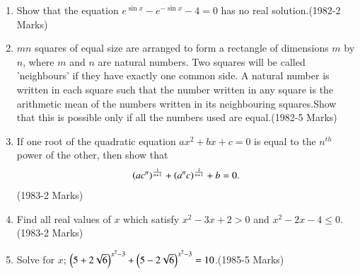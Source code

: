 \documentclass[journal]{IEEEtran}
\begin{document}
\begin{enumerate}[start=13]
\item Show that the equation $e^{\sin{x}}-e^{-\sin{x}}-4=0$ has no real solution.\hfill{(1982-2 Marks)}
\item $mn$ squares of equal size are arranged to form a rectangle of dimensions $m$ by $n$, where $m$ and $n$ are natural numbers. Two squares will be called 'neighbours' if they have exactly one common side. A natural number is written in each square such that the number written in any square is the arithmetic mean of the numbers written in its neighbouring squares.Show that this is possible only if all the numbers used are equal.\hfill{(1982-5 Marks)}
\item If one root of the quadratic equation $ax^2+bx+c=0$ is equal to the $n^{th}$ power of the other, then show that\begin{align*}
\left(ac^n\right)^\frac{1}{n+1} +\left(a^nc\right)^\frac{1}{n+1}+b=0. \end{align*} \hfill{(1983-2 Marks)}
 \item {Find all real values of $x$ which satisfy $x^2-3x+2>0$ and $x^2-2x-4\leq 0$.\hfill{(1983-2 Marks)}}
 \item Solve for $x$; $\left(5+2\sqrt{6}\right)^{x^2-3}+\left(5-2\sqrt{6}\right)^{x^2-3}=10$.\hfill{(1985-5 Marks)}
 

\end{enumerate}
\end{document}
